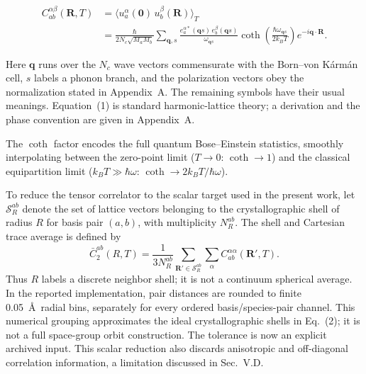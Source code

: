 \documentclass[aps,prb,reprint,amsmath,amssymb,floatfix]{revtex4-2}
\begin{document}
\color{revisionblue}
{\scriptsize
\begin{align}
C_{ab}^{\alpha\beta}(\mathbf{R},T)
  &= \langle u_a^\alpha(\mathbf{0})\, u_b^\beta(\mathbf{R})\rangle_T \nonumber \\
  &= \frac{\hbar}{2N_c\sqrt{M_a M_b}} \sum_{\mathbf{q},s}
     \frac{e_a^{\alpha*}(\mathbf{q}s)\,e_b^{\beta}(\mathbf{q}s)}{\omega_{\mathbf{q}s}}
     \coth\!\left(\frac{\hbar\omega_{\mathbf{q}s}}{2k_BT}\right)
     e^{-i\mathbf{q}\cdot\mathbf{R}} .
\end{align}
}
\color{black}

\color{revisionblue}
Here \(\mathbf q\) runs over the \(N_c\) wave vectors commensurate with the
Born--von K\'arm\'an cell, \(s\) labels a phonon branch, and the polarization
vectors obey the normalization stated in Appendix~A. The remaining symbols
have their usual meanings. Equation~(1) is standard harmonic-lattice theory;
a derivation and the phase convention are given in Appendix~A.
\color{black}

\color{revisionblue}
The \(\coth\) factor encodes the full quantum Bose--Einstein statistics,
smoothly interpolating between the zero-point limit (\(T\to 0\):
\(\coth\to 1\)) and the classical equipartition limit
(\(k_BT\gg\hbar\omega\): \(\coth\to 2k_BT/\hbar\omega\)).
\color{black}

\color{revisionblue}
To reduce the tensor correlator to the scalar target used in the present
work, let \(\mathcal S_R^{ab}\) denote the set of lattice vectors
belonging to the crystallographic shell of radius \(R\) for basis pair
\((a,b)\), with multiplicity \(N_R^{ab}\). The shell and Cartesian trace
average is defined by
\begin{equation}
\bar C_2^{ab}(R,T)=\frac{1}{3N_R^{ab}}
\sum_{\mathbf R'\in\mathcal S_R^{ab}}\sum_{\alpha}
C_{ab}^{\alpha\alpha}(\mathbf R',T).
\end{equation}
Thus \(R\) labels a discrete neighbor shell; it is not a continuum spherical
average. In the reported implementation, pair distances are rounded to finite
0.05~\AA\ radial bins, separately for every ordered basis/species-pair channel.
This numerical grouping approximates the ideal crystallographic shells in
Eq.~(2); it is not a full space-group orbit construction. The tolerance is now
an explicit archived input. This scalar reduction also discards anisotropic and
off-diagonal correlation information, a limitation discussed in Sec.~V.D.
\color{black}
\end{document}
